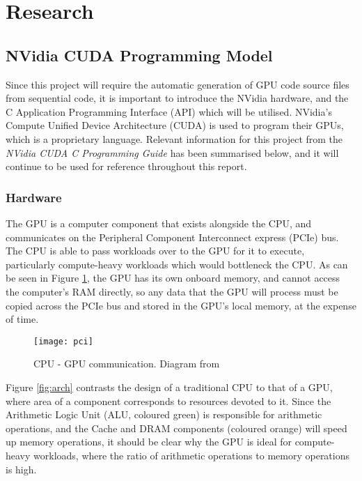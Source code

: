 
\section{Research}
\label{s:research}
\vspace{-2em}
\subsection{NVidia CUDA Programming Model}
Since this project will require the automatic generation of GPU code source files from sequential code, it is important to introduce the NVidia hardware, and the C Application Programming Interface (API) which will be utilised. NVidia's Compute Unified Device Architecture (CUDA) is used to program their GPUs, which is a proprietary language. Relevant information for this project from the \textit{NVidia CUDA C Programming Guide} \cite{guide} has been summarised below, and it will continue to be used for reference throughout this report.

\subsubsection{Hardware}
The GPU is a computer component that exists alongside the CPU, and communicates on the Peripheral Component Interconnect express (PCIe) bus. The CPU is able to pass workloads over to the GPU for it to execute, particularly compute-heavy workloads which would bottleneck the CPU. As can be seen in Figure \ref{fig:pci}, the GPU has its own onboard memory, and cannot access the computer's RAM directly, so any data that the GPU will process must be copied across the PCIe bus and stored in the GPU's local memory, at the expense of time.

\begin{figure}[h!]
  \centering
  \texttt{[image: pci]}
  \caption{\label{fig:pci} CPU - GPU communication. Diagram from \cite{nvlink}}
\end{figure}

\par
Figure \ref{fig:arch} contrasts the design of a traditional CPU to that of a GPU, where area of a component corresponds to resources devoted to it. Since the Arithmetic Logic Unit (ALU, coloured green) is responsible for arithmetic operations, and the Cache and DRAM components (coloured orange) will speed up memory operations, it should be clear why the GPU is ideal for compute-heavy workloads, where the ratio of arithmetic operations to memory operations is high.

